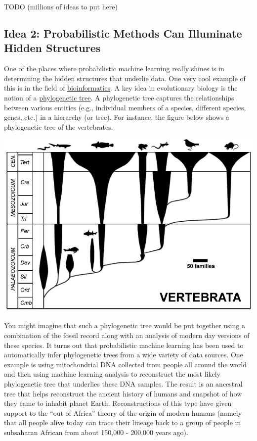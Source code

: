 \documentclass[assignment01_Solutions]{subfiles}
\begin{document}
\bi
\item TODO (millions of ideas to put here)
\ei


\subsection*{Idea 2: Probabilistic Methods Can Illuminate Hidden Structures}

One of the places where probabilistic machine learning really shines is in determining the hidden structures that underlie data.  One very cool example of this is in the field of \href{https://en.wikipedia.org/wiki/Bioinformatics}{bioinformatics}.  A key idea in evolutionary biology is the notion of a \href{https://en.wikipedia.org/wiki/Phylogenetic_tree}{phylogenetic tree}.  A phylogenetic tree captures the relationships between various entities (e.g., individual members of a species, different species, genes, etc.) in a hierarchy (or tree).  For instance, the figure below shows a phylogenetic tree of the vertebrates.

\begin{center}
\includegraphics[width=0.8\linewidth]{figures/vertebrates}
\end{center}

You might imagine that such a phylogenetic tree would be put together using a combination of the fossil record along with an analysis of modern day versions of these species.  It turns out that probabilistic machine learning has been used to automatically infer phylogenetic trees from a wide variety of data sources.  One example is using \href{https://en.wikipedia.org/wiki/Mitochondrial_DNA}{mitochondrial DNA} collected from people all around the world and then using machine learning analysis to reconstruct the most likely phylogenetic tree that underlies these DNA samples.  The result is an ancestral tree that helps reconstruct the ancient history of humans and snapshot of how they came to inhabit planet Earth.  Reconstructions of this type have given support to the ``out of Africa'' theory of the origin of modern humans (namely that all people alive today can trace their lineage back to a group of people in subsaharan African from about 150,000 - 200,000 years ago).
\end{document}
